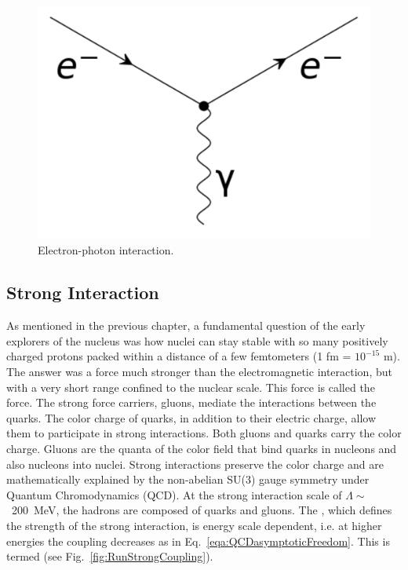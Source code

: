 \begin{figure}[htb!]
 \centering
 \includegraphics[scale=.25,keepaspectratio=true]{./LeptonInteraction.pdf}
 \caption{Electron-photon interaction.}
 \label{fig:LeptonInteraction}
\end{figure}

\subsection{Strong Interaction}\label{sec:StrongInteraction}
As mentioned in the previous chapter, a fundamental question of the early explorers of the nucleus was how nuclei can stay stable with so many positively charged protons packed within a distance of a few femtometers (1 fm = $10^{-15}$ m). The answer was a force much stronger than the electromagnetic interaction, but with a very short range confined to the nuclear scale. This force is called the  force. The strong force carriers, gluons, mediate the interactions between the quarks. The color charge of quarks, in addition to their electric charge, allow them to participate in strong interactions. Both gluons and quarks carry the color charge. Gluons are the quanta of the color field that bind quarks in nucleons and also nucleons into nuclei. Strong interactions preserve the color charge and are mathematically explained by the non-abelian SU(3) gauge symmetry under Quantum Chromodynamics (QCD). At the strong interaction scale of $\Lambda \sim$~200~MeV, the hadrons are composed of quarks and gluons. The , which defines the strength of the strong interaction, is energy scale dependent, i.e. at higher energies the coupling decreases as in Eq.~\ref{eqa:QCDasymptoticFreedom}. This is termed  (see Fig.~\ref{fig:RunStrongCoupling}).

